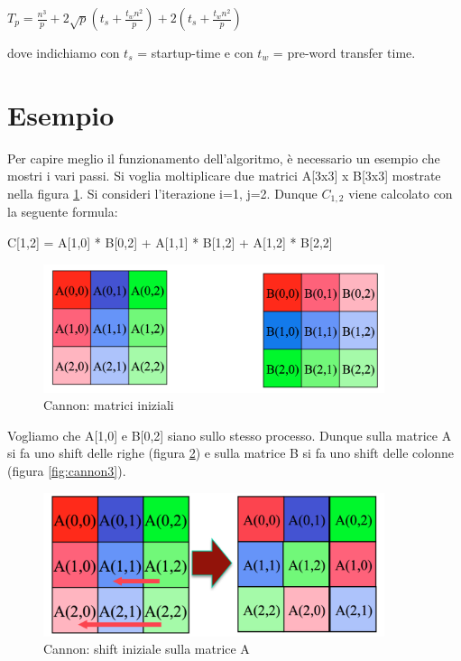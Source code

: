 $T_p = \frac{n^3}{p} + 2\sqrt{p}(t_s + \frac{t_wn^2}{p}) + 2(t_s + \frac{t_wn^2}{p})$

dove indichiamo con $t_s$ = startup-time e con $t_w$ = pre-word transfer time.
\section{Esempio}

Per capire meglio il funzionamento dell'algoritmo, \`{e} necessario un esempio che mostri i vari passi. Si voglia moltiplicare due matrici A[3x3] x B[3x3] mostrate nella figura \ref{fig:cannon1}. Si consideri l'iterazione i=1, j=2. Dunque $C_{1,2}$ viene calcolato con la seguente formula:

C[1,2] = A[1,0] * B[0,2] + A[1,1] * B[1,2] + A[1,2] * B[2,2]

\begin{figure}[htbp]
    \begin{center}
        \includegraphics[width=10cm]{immagini/cannon1.png}
    \end{center}
    \caption{Cannon: matrici iniziali}
    \label{fig:cannon1}
\end{figure}

Vogliamo che A[1,0] e B[0,2] siano sullo stesso processo. Dunque sulla matrice A si fa uno shift delle righe (figura \ref{fig:cannon2}) e sulla matrice B si fa uno shift delle colonne (figura \ref{fig:cannon3}).

\begin{figure}[htbp]
    \begin{center}
        \includegraphics[width=10cm]{immagini/cannon2.png}
    \end{center}
    \caption{Cannon: shift iniziale sulla matrice A}
    \label{fig:cannon2}
\end{figure}

